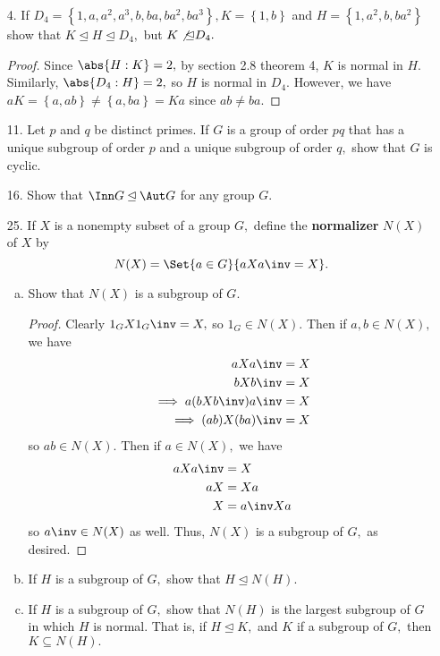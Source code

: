 \documentclass{article}
\begin{document}
\begin{itemize}
	\item[4.] If $D_4=\left\{ 1, a, a^2, a^3, b, ba, ba^2, ba^3 \right\},K=\left\{ 1, b \right\}$ and $H=\left\{ 1, a^2, b, ba^2\right\}$ show that $K\unlhd H\unlhd D_4,$ but $K\not\unlhd D_4.$
		\begin{proof}
			Since $\abs{H:K}=2,$ by section 2.8 theorem 4, $K$ is normal in $H.$ Similarly, $\abs{D_4:H}=2,$ so $H$ is normal in $D_4.$ However, we have $aK=\left\{ a, ab \right\}\neq \left\{ a, ba \right\}=Ka$ since $ab\neq ba.$
			
		\end{proof}

	\item[11.] Let $p$ and $q$ be distinct primes. If $G$ is a group of order $pq$ that has a unique subgroup of order $p$ and a unique subgroup of order $q,$ show that $G$ is cyclic.

	\item[16.] Show that $\Inn G\unlhd \Aut G$ for any group $G.$

	\item[25.] If $X$ is a nonempty subset of a group $G,$ define the \textbf{normalizer} $N(X)$ of $X$ by \[N(X)=\Set{a\in G}{aXa\inv=X}.\]
		\begin{enumerate}[(a)]
			\item Show that $N(X)$ is a subgroup of $G.$
				\begin{proof}
					Clearly $1_GX1_G\inv=X,$ so $1_G\in N(X).$ Then if $a, b\in N(X),$ we have 
					\begin{align*}
						aXa\inv &= X \\
						bXb\inv &= X \\
						\implies a(bXb\inv)a\inv &= X \\
						\implies (ab)X(ba)\inv &= X
					\end{align*} so $ab\in N(X).$ Then if $a\in N(X),$ we have 
					\begin{align*}
						aXa\inv &= X \\
						aX &= Xa \\
						X &= a\inv Xa
					\end{align*} so $a\inv\in N(X)$ as well. Thus, $N(X)$ is a subgroup of $G,$ as desired.
					
				\end{proof}

			\item If $H$ is a subgroup of $G,$ show that $H\unlhd N(H).$

			\item If $H$ is a subgroup of $G,$ show that $N(H)$ is the largest subgroup of $G$ in which $H$ is normal. That is, if $H\unlhd K,$ and $K$ if a subgroup of $G,$ then $K\subseteq N\left( H \right).$
				
		\end{enumerate}
		
\end{itemize}
\end{document}
